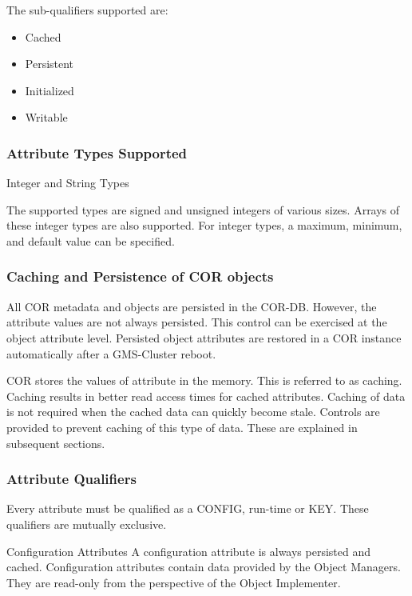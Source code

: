 \begin{flushleft}
The sub-qualifiers supported are:
\begin{itemize}
\item
Cached
\item
Persistent
\item
Initialized
\item
Writable
\end{itemize}

\subsubsection{Attribute Types Supported}
\begin{Desc}
\item[Integer and String Types]\end{Desc}

The supported types are signed and unsigned integers of various sizes. Arrays of these integer types are also supported.  For integer types, 
a maximum, minimum, and default value can be specified.


\subsubsection{Caching and Persistence of COR objects}
All COR metadata and objects are persisted in the COR-DB. However, the attribute values are not always persisted. This control can be exercised at 
the object attribute level. Persisted object attributes are restored in a COR instance automatically after a GMS-Cluster reboot.
\par 
COR stores the values of attribute in the memory. This is referred to as caching. Caching results in better read access times for cached attributes. Caching of 
data is not required when the cached data can quickly become stale. Controls are provided to prevent caching of this type of data. These are explained in
subsequent sections.  

\subsubsection{Attribute Qualifiers}
Every attribute must be qualified as a CONFIG, run-time or KEY. These qualifiers are mutually exclusive.


\begin{Desc}
\item
[Configuration Attributes]
A configuration attribute is always persisted and cached. Configuration attributes contain data provided by the Object Managers. They are read-only from
the perspective of the Object Implementer.


\end{Desc}
\end{flushleft}
